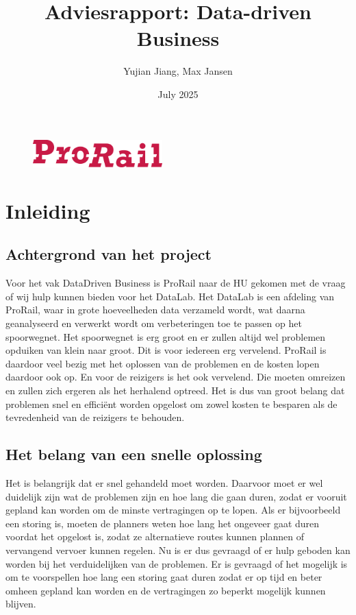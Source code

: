 \documentclass{article}
\title{Adviesrapport: Data-driven Business}
\author{Yujian Jiang, Max Jansen}
\date{July 2025}
\begin{document}
\maketitle

\begin{figure}
    \centering
    \includegraphics[width=5cm]{prorail.png}
\end{figure}

\newpage
\tableofcontents

\newpage
\section{Inleiding}

\subsection{Achtergrond van het project}
Voor het vak DataDriven Business is ProRail naar de HU gekomen met de vraag of wij hulp kunnen bieden voor het DataLab. Het DataLab is een afdeling van ProRail, waar in grote hoeveelheden data verzameld wordt, wat daarna geanalyseerd en verwerkt wordt om verbeteringen toe te passen op het spoorwegnet. Het spoorwegnet is erg groot en er zullen altijd wel problemen opduiken van klein naar groot. Dit is voor iedereen erg vervelend. ProRail is daardoor veel bezig met het oplossen van de problemen en de kosten lopen daardoor ook op. En voor de reizigers is het ook vervelend. Die moeten omreizen en zullen zich ergeren als het herhalend optreed. Het is dus van groot belang dat problemen snel en efficiënt worden opgelost om zowel kosten te besparen als de tevredenheid van de reizigers te behouden.

\subsection{Het belang van een snelle oplossing}
Het is belangrijk dat er snel gehandeld moet worden. Daarvoor moet er wel duidelijk zijn wat de problemen zijn en hoe lang die gaan duren, zodat er vooruit gepland kan worden om de minste vertragingen op te lopen. Als er bijvoorbeeld een storing is, moeten de planners weten hoe lang het ongeveer gaat duren voordat het opgelost is, zodat ze alternatieve routes kunnen plannen of vervangend vervoer kunnen regelen. Nu is er dus gevraagd of er hulp geboden kan worden bij het verduidelijken van de problemen. Er is gevraagd of het mogelijk is om te voorspellen hoe lang een storing gaat duren zodat er op tijd en beter omheen gepland kan worden en de vertragingen zo beperkt mogelijk kunnen blijven.
\end{document}
